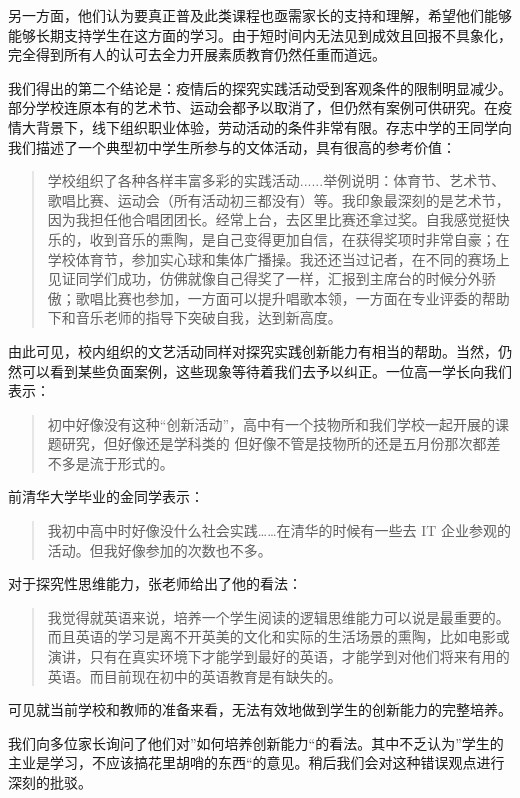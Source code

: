 \documentclass[12pt,UTF8]{ctexart}
\begin{document}
\par {
	
	另一方面，他们认为要真正普及此类课程也亟需家长的支持和理解，希望他们能够能够长期支持学生在这方面的学习。由于短时间内无法见到成效且回报不具象化，完全得到所有人的认可去全力开展素质教育仍然任重而道远。
}
\par {
	
	我们得出的第二个结论是：疫情后的探究实践活动受到客观条件的限制明显减少。部分学校连原本有的艺术节、运动会都予以取消了，但仍然有案例可供研究。在疫情大背景下，线下组织职业体验，劳动活动的条件非常有限。存志中学的王同学向我们描述了一个典型初中学生所参与的文体活动，具有很高的参考价值：
	\begin{quote}
		\kaishu
		学校组织了各种各样丰富多彩的实践活动......举例说明：体育节、艺术节、歌唱比赛、运动会（所有活动初三都没有）等。我印象最深刻的是艺术节，因为我担任他合唱团团长。经常上台，去区里比赛还拿过奖。自我感觉挺快乐的，收到音乐的熏陶，是自己变得更加自信，在获得奖项时非常自豪；在学校体育节，参加实心球和集体广播操。我还还当过记者，在不同的赛场上见证同学们成功，仿佛就像自己得奖了一样，汇报到主席台的时候分外骄傲；歌唱比赛也参加，一方面可以提升唱歌本领，一方面在专业评委的帮助下和音乐老师的指导下突破自我，达到新高度。
	\end{quote}
	由此可见，校内组织的文艺活动同样对探究实践创新能力有相当的帮助。当然，仍然可以看到某些负面案例，这些现象等待着我们去予以纠正。一位高一学长向我们表示：
	\begin{quote}
		\kaishu 初中好像没有这种“创新活动”，高中有一个技物所和我们学校一起开展的课题研究，但好像还是学科类的
		但好像不管是技物所的还是五月份那次都差不多是流于形式的。
	\end{quote}
	前清华大学毕业的金同学表示：
	\begin{quote}
		\kaishu 我初中高中时好像没什么社会实践……在清华的时候有一些去 IT 企业参观的活动。但我好像参加的次数也不多。
	\end{quote}
	对于探究性思维能力，张老师给出了他的看法：
	\begin{quote}
		\kaishu
		我觉得就英语来说，培养一个学生阅读的逻辑思维能力可以说是最重要的。而且英语的学习是离不开英美的文化和实际的生活场景的熏陶，比如电影或演讲，只有在真实环境下才能学到最好的英语，才能学到对他们将来有用的英语。而目前现在初中的英语教育是有缺失的。
	\end{quote}
	可见就当前学校和教师的准备来看，无法有效地做到学生的创新能力的完整培养。
}
\par {
	我们向多位家长询问了他们对”如何培养创新能力“的看法。其中不乏认为”学生的主业是学习，不应该搞花里胡哨的东西“的意见。稍后我们会对这种错误观点进行深刻的批驳。
}
\end{document}
